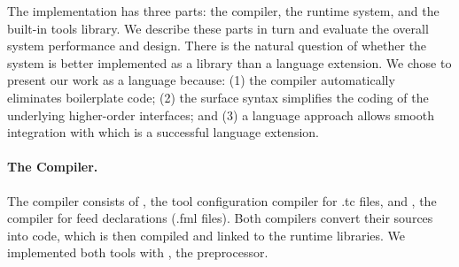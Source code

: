 The \padsd{} implementation has three parts: the compiler, the runtime
system, and the built-in tools library. We describe these
parts in turn and evaluate the overall system performance and design.
There is the natural question of whether the system is better
implemented as a library than a language extension. We chose
to present our work as a language because: (1) the compiler automatically
eliminates boilerplate code; (2) the surface syntax simplifies the coding of
the underlying higher-order interfaces; and (3) a language approach allows
smooth integration with \padsml which is a successful language extension.


\paragraph*{The Compiler.}
The \padsd{} compiler consists of
, the tool configuration compiler for .tc files, 
and 
, the compiler for feed declarations (.fml files). 
Both compilers convert their sources into \ocaml{} code, which is then
compiled
and linked to the runtime libraries.  We implemented both tools with
\camlp{}, the \ocaml{} preprocessor. 


